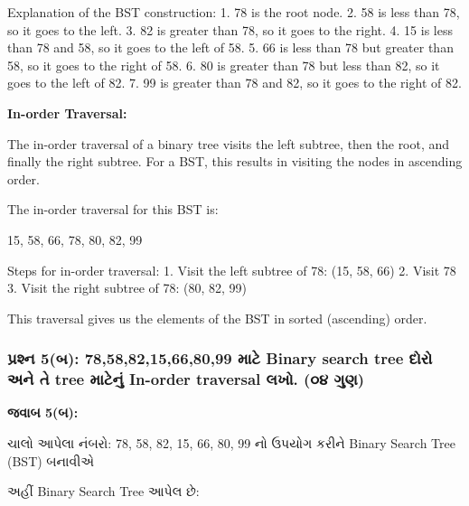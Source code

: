 Explanation of the BST construction: 1. 78 is the root node. 2. 58 is
less than 78, so it goes to the left. 3. 82 is greater than 78, so it
goes to the right. 4. 15 is less than 78 and 58, so it goes to the left
of 58. 5. 66 is less than 78 but greater than 58, so it goes to the
right of 58. 6. 80 is greater than 78 but less than 82, so it goes to
the left of 82. 7. 99 is greater than 78 and 82, so it goes to the right
of 82.

\textbf{In-order Traversal:}

The in-order traversal of a binary tree visits the left subtree, then
the root, and finally the right subtree. For a BST, this results in
visiting the nodes in ascending order.

The in-order traversal for this BST is:

15, 58, 66, 78, 80, 82, 99

Steps for in-order traversal: 1. Visit the left subtree of 78: (15, 58,
66) 2. Visit 78 3. Visit the right subtree of 78: (80, 82, 99)

This traversal gives us the elements of the BST in sorted (ascending)
order.

\hypertarget{uxaaauxab0uxab6uxaa8-5uxaac-78588215668099-uxaaeuxa9f-binary-search-tree-uxaa6uxab0-uxa85uxaa8-uxaa4-tree-uxaaeuxa9fuxaa8-in-order-traversal-uxab2uxa96.-uxae6uxaea-uxa97uxaa3}{%
\subsubsection{પ્રશ્ન 5(બ): 78,58,82,15,66,80,99 માટે Binary search tree
દોરો અને તે tree માટેનું In-order traversal લખો. (૦૪
ગુણ)}\label{uxaaauxab0uxab6uxaa8-5uxaac-78588215668099-uxaaeuxa9f-binary-search-tree-uxaa6uxab0-uxa85uxaa8-uxaa4-tree-uxaaeuxa9fuxaa8-in-order-traversal-uxab2uxa96.-uxae6uxaea-uxa97uxaa3}}

\textbf{જવાબ 5(બ):}

ચાલો આપેલા નંબરો: 78, 58, 82, 15, 66, 80, 99 નો ઉપયોગ કરીને Binary Search
Tree (BST) બનાવીએ

અહીં Binary Search Tree આપેલ છે:

\begin{Shaded}
\begin{Highlighting}[]
\end{Highlighting}
\end{Shaded}

